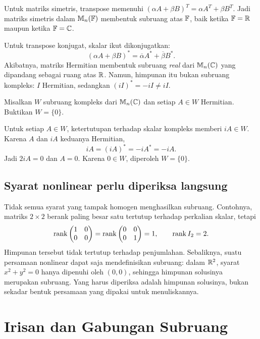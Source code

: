 Untuk matriks simetris, transpose memenuhi
$(\alpha A+\beta B)^T=\alpha A^T+\beta B^T$.
Jadi matriks simetris dalam $\mathbb{M}_n(\mathbb{F})$ membentuk subruang atas
$\mathbb{F}$, baik ketika $\mathbb{F}=\mathbb{R}$ maupun ketika $\mathbb{F}=\mathbb{C}$.

Untuk transpose konjugat, skalar ikut dikonjugatkan:
\[
    (\alpha A+\beta B)^*=
    \overline\alpha A^*+\overline\beta B^*.
\]
Akibatnya, matriks Hermitian membentuk subruang \emph{real}
dari $\mathbb{M}_n(\mathbb{C})$ yang dipandang sebagai ruang atas $\mathbb{R}$.
Namun, himpunan itu bukan subruang kompleks: $I$ Hermitian,
sedangkan $(iI)^*=-iI\ne iI$.

\begin{exam}
    Misalkan $W$ subruang kompleks dari $\mathbb{M}_n(\mathbb{C})$ dan setiap
    $A\in W$ Hermitian. Buktikan $W=\{0\}$.
\end{exam}
\begin{solution}
    Untuk setiap $A\in W$, ketertutupan terhadap skalar kompleks
    memberi $iA\in W$. Karena $A$ dan $iA$ keduanya Hermitian,
    \[
        iA=(iA)^*=-iA^*=-iA.
    \]
    Jadi $2iA=0$ dan $A=0$. Karena $0\in W$, diperoleh $W=\{0\}$.
\end{solution}

\subsection{Syarat nonlinear perlu diperiksa langsung}

Tidak semua syarat yang tampak homogen menghasilkan subruang.
Contohnya, matriks $2\times2$ berank paling besar satu tertutup
terhadap perkalian skalar, tetapi
\[
    \operatorname{rank}\begin{pmatrix}1&0\\0&0\end{pmatrix}
    =\operatorname{rank}\begin{pmatrix}0&0\\0&1\end{pmatrix}=1,
    \qquad \operatorname{rank} I_2=2.
\]
Himpunan tersebut tidak tertutup terhadap penjumlahan.
Sebaliknya, suatu persamaan nonlinear dapat saja mendefinisikan
subruang: dalam $\mathbb{R}^2$, syarat $x^2+y^2=0$ hanya dipenuhi oleh
$(0,0)$, sehingga himpunan solusinya merupakan subruang.
Yang harus diperiksa adalah himpunan solusinya, bukan sekadar
bentuk persamaan yang dipakai untuk menuliskannya.

\section{Irisan dan Gabungan Subruang}
\label{linear:irisan-gabungan}

